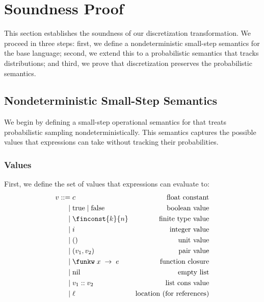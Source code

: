 \section{Soundness Proof}\label{sec:soundness}

This section establishes the soundness of our discretization transformation. We proceed in three steps: first, we define a nondeterministic small-step semantics for the base language; second, we extend this to a probabilistic semantics that tracks distributions; and third, we prove that discretization preserves the probabilistic semantics.

\subsection{Nondeterministic Small-Step Semantics}

We begin by defining a small-step operational semantics for \Slice{} that treats probabilistic sampling nondeterministically. This semantics captures the possible values that expressions can take without tracking their probabilities.

\subsubsection{Values}

First, we define the set of values that expressions can evaluate to:
\begin{align*}
v ::= &\; c                                  & \text{float constant} \\
    | &\; \text{true} \mid \text{false}      & \text{boolean value} \\
    | &\; \finconst{k}{n}                    & \text{finite type value} \\
    | &\; i                                  & \text{integer value} \\
    | &\; ()                                 & \text{unit value} \\
    | &\; (v_1, v_2)                         & \text{pair value} \\
    | &\; \funkw \; x \; \rightarrow \; e    & \text{function closure} \\
    | &\; \text{nil}                         & \text{empty list} \\
    | &\; v_1 :: v_2                         & \text{list cons value} \\
    | &\; \ell                               & \text{location (for references)}
\end{align*}

